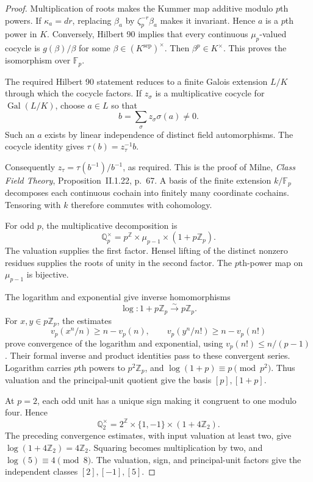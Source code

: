 \begin{proof}
Multiplication of roots makes the Kummer map additive modulo \(p\)th
powers. If \(\kappa_a=dr\), replacing \(\beta_a\) by
\(\zeta_p^{-r}\beta_a\) makes it invariant. Hence \(a\) is a \(p\)th
power in \(K\). Conversely, Hilbert 90 implies that every continuous
\(\mu_p\)-valued cocycle is \(g(\beta)/\beta\) for some
\(\beta\in(K^{\mathrm{sep}})^\times\). Then \(\beta^p\in K^\times\).
This proves the isomorphism over \(\mathbb F_p\).

The required Hilbert 90 statement reduces to a finite Galois extension
\(L/K\) through which the cocycle factors. If \(z_\sigma\) is a
multiplicative cocycle for \(\operatorname{Gal}(L/K)\), choose \(a\in L\)
so that
\[
 b=\sum_\sigma z_\sigma\sigma(a)\ne0.
\]
Such an \(a\) exists by linear independence of distinct field automorphisms.
The cocycle identity gives \(\tau(b)=z_\tau^{-1}b\).

Consequently \(z_\tau=\tau(b^{-1})/b^{-1}\), as required.
This is the proof of Milne, \emph{Class Field Theory}, Proposition~II.1.22, p.~67.
A basis of the finite extension \(k/\mathbb F_p\) decomposes each continuous
cochain into finitely many coordinate cochains. Tensoring with \(k\)
therefore commutes with cohomology.

For odd \(p\), the multiplicative decomposition is
\[
 \mathbb Q_p^\times=p^{\mathbb Z}\times\mu_{p-1}\times(1+p\mathbb Z_p).
\]
The valuation supplies the first factor. Hensel lifting of the distinct
nonzero residues supplies the roots of unity in the second factor.
The \(p\)th-power map on \(\mu_{p-1}\) is bijective.

The logarithm and exponential give inverse homomorphisms
\[
 \log:1+p\mathbb Z_p\xrightarrow{\sim}p\mathbb Z_p.
\]
For \(x,y\in p\mathbb Z_p\), the estimates
\[
 v_p(x^n/n)\ge n-v_p(n),\qquad
 v_p(y^n/n!)\ge n-v_p(n!)
\]
prove convergence of the logarithm and exponential, using
\(v_p(n!)\le n/(p-1)\). Their formal inverse
and product identities pass to these convergent series.
Logarithm carries \(p\)th powers to \(p^2\mathbb Z_p\), and
\(\log(1+p)\equiv p\pmod{p^2}\).
Thus valuation and the principal-unit quotient give the basis
\([p],[1+p]\).

At \(p=2\), each odd unit has a unique sign making it congruent to
one modulo four. Hence
\[
 \mathbb Q_2^\times=2^{\mathbb Z}\times\{1,-1\}\times(1+4\mathbb Z_2).
\]
The preceding convergence estimates, with input valuation at least two,
give \(\log(1+4\mathbb Z_2)=4\mathbb Z_2\).
Squaring becomes multiplication by two, and
\(\log(5)\equiv4\pmod8\). The valuation, sign, and principal-unit
factors give the independent classes \([2],[-1],[5]\).
\end{proof}

